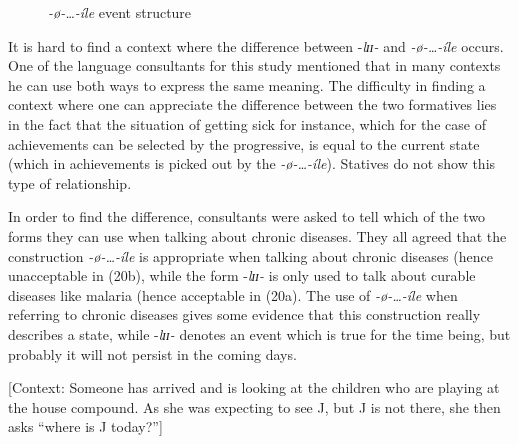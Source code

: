 \documentclass[output=paper,newtxmath,modfonts,nonflat,draftmode]{langsci/langscibook}
\begin{document}
\begin{figure}
\caption{\textit{-ø-…-íle} event structure\label{fig:kanijo:8}}
\end{figure}

It is hard to find a context where the difference between -\textit{lɪɪ-} and \textit{-ø-…-íle} occurs. One of the language consultants for this study mentioned that in many contexts he can use both ways to express the same meaning. The difficulty in finding a context where one can appreciate the difference between the two formatives lies in the fact that the situation of getting sick for instance, which for the case of achievements can be selected by the progressive, is equal to the current state (which in achievements is picked out by the \textit{-ø-…-íle}). Statives do not show this type of relationship.

In order to find the difference, consultants were asked to tell which of the two forms they can use when talking about chronic diseases. They all agreed that the construction \textit{-ø-…-íle} is appropriate when talking about chronic diseases (hence unacceptable in (20b), while the form -\textit{lɪɪ-} is only used to talk about curable diseases like malaria (hence acceptable in (20a). The use of \textit{-ø-…-íle} when referring to chronic diseases gives some evidence that this construction really describes a state, while -\textit{lɪɪ-} denotes an event which is true for the time being, but probably it will not persist in the coming days. 

\ea{}\label{ex:kanijo:20}
[Context: Someone has arrived and is looking at the children who are playing at the house compound. As she was expecting to see J, but J is not there, she then asks “where is J today?”] 



\z
\z
\end{document}
